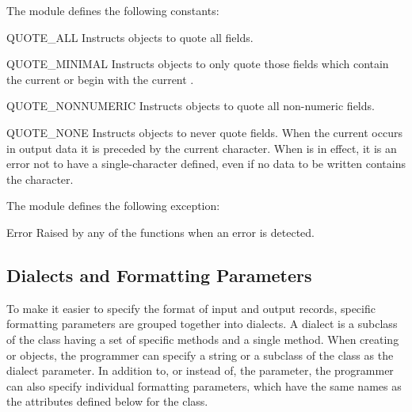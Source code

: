 The  module defines the following constants:

\begin{datadesc}{QUOTE_ALL}
Instructs  objects to quote all fields.
\end{datadesc}

\begin{datadesc}{QUOTE_MINIMAL}
Instructs  objects to only quote those fields which contain
the current  or begin with the current .
\end{datadesc}

\begin{datadesc}{QUOTE_NONNUMERIC}
Instructs  objects to quote all non-numeric fields.
\end{datadesc}

\begin{datadesc}{QUOTE_NONE}
Instructs  objects to never quote fields.  When the current
 occurs in output data it is preceded by the current
 character.  When  is in effect, it
is an error not to have a single-character  defined, even if
no data to be written contains the  character.
\end{datadesc}


The  module defines the following exception:

\begin{excdesc}{Error}
Raised by any of the functions when an error is detected.
\end{excdesc}


\subsection{Dialects and Formatting Parameters\label{csv-fmt-params}}

To make it easier to specify the format of input and output records,
specific formatting parameters are grouped together into dialects.  A
dialect is a subclass of the  class having a set of specific
methods and a single  method.  When creating 
or  objects, the programmer can specify a string or a subclass
of the  class as the dialect parameter.  In addition to, or
instead of, the  parameter, the programmer can also specify
individual formatting parameters, which have the same names as the
attributes defined below for the  class.

